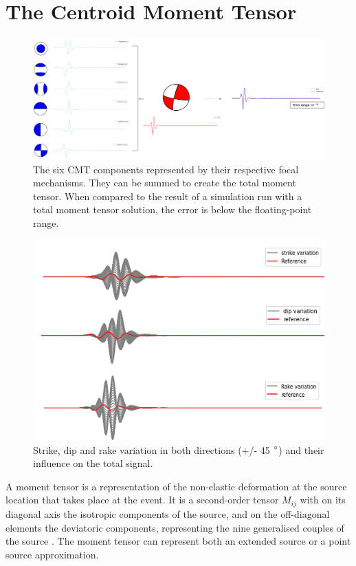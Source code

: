 \documentclass[../Text/00main.tex]{subfiles}
\begin{document}
\section{The Centroid Moment Tensor}\label{sec:CMTexplanation}


\begin{figure}
    \centering
    \includegraphics[width=.85\textwidth]{images_methods/cmtcombi_informationfigure.png}
    \caption{The six CMT components represented by their respective focal mechanisms. They can be summed to create the total moment tensor. When compared to the result of a simulation run with a total moment tensor solution, the error is below the floating-point range.}
    \label{fig:cmtseparatecombine}
\end{figure}

\begin{figure}
    \centering
    \includegraphics[width=.75\textwidth]{images_methods/expl_sdrvar_prettyfigure.png}
    \caption{Strike, dip and rake variation in both directions (+/- 45 $\degree$) and their influence on the total signal.}
    \label{fig:cmtprettyfigure}
\end{figure}

A moment tensor is a representation of the non-elastic deformation at the source location that takes place at the event. It is a second-order tensor $M_{ij}$ with on its diagonal axis the isotropic components of the source, and on the off-diagonal elements the deviatoric components, representing the nine generalised couples of the source \cite{richards1980quantitative}. The moment tensor can represent both an extended source or a point source approximation.
\end{document}
